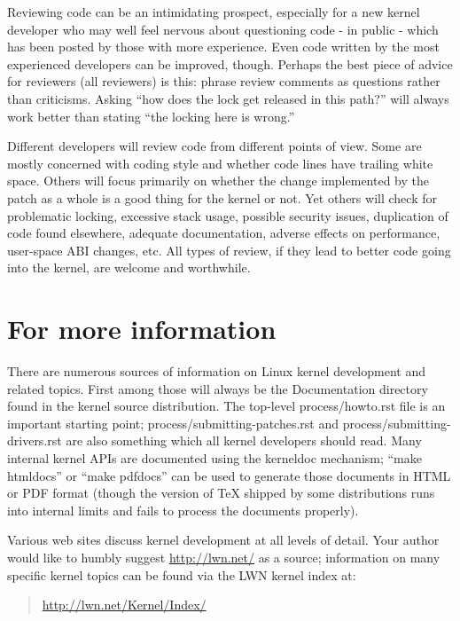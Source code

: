 \documentclass[a4paper,8pt,english]{sphinxmanual}
\begin{document}
Reviewing code can be an intimidating prospect, especially for a new kernel
developer who may well feel nervous about questioning code - in public -
which has been posted by those with more experience.  Even code written by
the most experienced developers can be improved, though.  Perhaps the best
piece of advice for reviewers (all reviewers) is this: phrase review
comments as questions rather than criticisms.  Asking ``how does the lock
get released in this path?'' will always work better than stating ``the
locking here is wrong.''

Different developers will review code from different points of view.  Some
are mostly concerned with coding style and whether code lines have trailing
white space.  Others will focus primarily on whether the change implemented
by the patch as a whole is a good thing for the kernel or not.  Yet others
will check for problematic locking, excessive stack usage, possible
security issues, duplication of code found elsewhere, adequate
documentation, adverse effects on performance, user-space ABI changes, etc.
All types of review, if they lead to better code going into the kernel, are
welcome and worthwhile.


\section{For more information}
\label{process/8.Conclusion:for-more-information}\label{process/8.Conclusion::doc}\label{process/8.Conclusion:development-conclusion}
There are numerous sources of information on Linux kernel development and
related topics.  First among those will always be the Documentation
directory found in the kernel source distribution.  The top-level process/howto.rst
file is an important starting point; process/submitting-patches.rst and
process/submitting-drivers.rst are also something which all kernel developers should
read.  Many internal kernel APIs are documented using the kerneldoc
mechanism; ``make htmldocs'' or ``make pdfdocs'' can be used to generate those
documents in HTML or PDF format (though the version of TeX shipped by some
distributions runs into internal limits and fails to process the documents
properly).

Various web sites discuss kernel development at all levels of detail.  Your
author would like to humbly suggest \href{http://lwn.net/}{http://lwn.net/} as a source;
information on many specific kernel topics can be found via the LWN kernel
index at:
\begin{quote}

\href{http://lwn.net/Kernel/Index/}{http://lwn.net/Kernel/Index/}
\end{quote}
\end{document}
